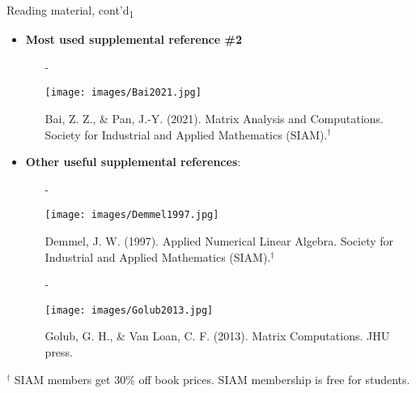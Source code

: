 \documentclass[t,usepdftitle=false]{beamer}
\begin{document}
\begin{frame}{Reading material, cont'd\textsubscript{1}}
\begin{itemize}
\item \textbf{Most used supplemental reference \#2}
\begin{itemize}
\item[-]\begin{minipage}{0.2\textwidth}\vspace{.3cm}
\texttt{[image: images/Bai2021.jpg]}
\end{minipage}
\hspace{-.8cm}
\begin{minipage}{0.75\textwidth}
Bai, Z. Z., \& Pan, J.-Y. (2021). Matrix Analysis and Computations. 
Society for Industrial and Applied Mathematics (SIAM).${}^\dagger$
\end{minipage}\vspace{.3cm}
\end{itemize}
\item \textbf{Other useful supplemental references}:
\begin{itemize}
\item[-]\begin{minipage}{0.2\textwidth}\vspace{.3cm}
\texttt{[image: images/Demmel1997.jpg]}
\end{minipage}
\hspace{-.8cm}
\begin{minipage}{0.75\textwidth}
Demmel, J. W. (1997). Applied Numerical Linear Algebra. 
Society for Industrial and Applied Mathematics (SIAM).${}^\dagger$
\end{minipage}\vspace{.3cm}
\item[-]\begin{minipage}{0.2\textwidth}\vspace{.3cm}
\texttt{[image: images/Golub2013.jpg]}
\end{minipage}
\hspace{-.8cm}
\begin{minipage}{0.75\textwidth}
Golub, G. H., \& Van Loan, C. F. (2013). Matrix Computations. 
JHU press.
\end{minipage}\vspace{.1cm}
\end{itemize}
\end{itemize}
\vfill
\tiny{${}^\dagger$ SIAM members get 30\% off book prices. SIAM membership is free for students.}
\end{frame}
\end{document}
